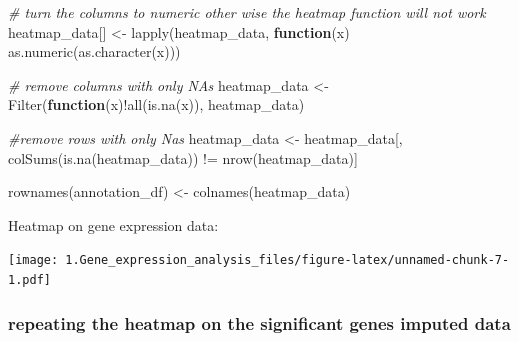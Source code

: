 \documentclass[
]{article}
\newenvironment{Shaded}{\begin{snugshade}}{\end{snugshade}}
\newcommand{\CommentTok}[1]{\textcolor[rgb]{0.56,0.35,0.01}{\textit{#1}}}
\newcommand{\ControlFlowTok}[1]{\textcolor[rgb]{0.13,0.29,0.53}{\textbf{#1}}}
\newcommand{\FunctionTok}[1]{\textcolor[rgb]{0.00,0.00,0.00}{#1}}
\newcommand{\NormalTok}[1]{#1}
\newcommand{\OtherTok}[1]{\textcolor[rgb]{0.56,0.35,0.01}{#1}}
\newcommand{\SpecialCharTok}[1]{\textcolor[rgb]{0.00,0.00,0.00}{#1}}
\begin{document}
\begin{Shaded}
\begin{Highlighting}[]
 \CommentTok{\# turn the columns to numeric other wise the heatmap function will not work}
\NormalTok{ heatmap\_data[] }\OtherTok{\textless{}{-}} \FunctionTok{lapply}\NormalTok{(heatmap\_data, }\ControlFlowTok{function}\NormalTok{(x) }\FunctionTok{as.numeric}\NormalTok{(}\FunctionTok{as.character}\NormalTok{(x)))}

 \CommentTok{\# remove columns with only NAs }
\NormalTok{ heatmap\_data }\OtherTok{\textless{}{-}} \FunctionTok{Filter}\NormalTok{(}\ControlFlowTok{function}\NormalTok{(x)}\SpecialCharTok{!}\FunctionTok{all}\NormalTok{(}\FunctionTok{is.na}\NormalTok{(x)), heatmap\_data) }
 
 \CommentTok{\#remove rows with only Nas}
\NormalTok{ heatmap\_data }\OtherTok{\textless{}{-}}\NormalTok{  heatmap\_data[, }\FunctionTok{colSums}\NormalTok{(}\FunctionTok{is.na}\NormalTok{(heatmap\_data)) }\SpecialCharTok{!=} \FunctionTok{nrow}\NormalTok{(heatmap\_data)]}

\FunctionTok{rownames}\NormalTok{(annotation\_df) }\OtherTok{\textless{}{-}} \FunctionTok{colnames}\NormalTok{(heatmap\_data)}
\end{Highlighting}
\end{Shaded}

Heatmap on gene expression data:

\texttt{[image: 1.Gene\_expression\_analysis\_files/figure-latex/unnamed-chunk-7-1.pdf]}

\hypertarget{repeating-the-heatmap-on-the-significant-genes-imputed-data}{%
\subsubsection{repeating the heatmap on the significant genes imputed
data}\label{repeating-the-heatmap-on-the-significant-genes-imputed-data}}
\end{document}
